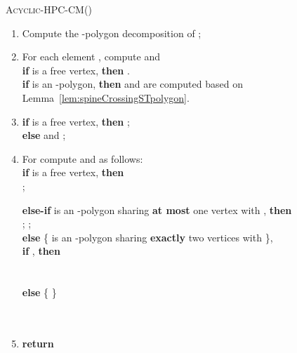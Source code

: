 \documentclass{myllncs-mixalis}
\begin{document}
\begin{algorithm2e}[tb]




\caption{\textsc{Acyclic-HPC-CM()}}

\label{alg:AHPCCM}

\begin{enumerate}
\item
Compute the -polygon decomposition  of ;\;
\item For each element , compute  and \\
\hspace*{.7cm}\textbf{if}  is a free vertex, \textbf{then}
. \\
\hspace*{.7cm}\textbf{if}  is an -polygon, \textbf{then}
 and  are computed based on\\
\hspace*{1.4cm}Lemma~\ref{lem:spineCrossingSTpolygon}.\\

\item \textbf{if}  is a free vertex, \textbf{then} ;\\
\textbf{else}   and ;
\item
 For  compute  and  as
 follows:\\
\hspace*{.7cm}  \textbf{if}  is a free vertex, \textbf{then}\\
     \hspace*{1.4cm} ;

\hspace*{.7cm}  \textbf{else-if}  is an -polygon sharing \textbf{at most} one vertex with , \textbf{then}\\
     \hspace*{1.4cm} ;
     \hspace*{1.4cm} ;\\
\hspace*{.7cm}  \textbf{else} \{  is an -polygon sharing \textbf{exactly} two vertices with \}, \\

    \hspace*{1.4cm} \textbf{if} , \textbf{then} \\
        \hspace*{2.1cm}  \\
        \hspace*{2.1cm}  \\

    \hspace*{1.4cm} \textbf{else} \{  \} \\
        \hspace*{2.1cm} \\
        \hspace*{2.1cm}  \\
\item \textbf{return} 
\end{enumerate}
\end{algorithm2e}
\end{document}
